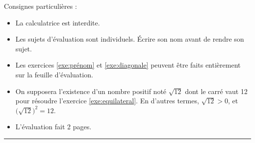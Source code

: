 
\usepackage{needspace}

\SetDate[15/10/2025]
\reversemarginpar
\setlength{\marginparsep}{.5cm}

\newcommand{\exeI}{1}
\newcommand{\exeII}{2}
\newcommand{\exeIII}{3}
\newcommand{\exeIV}{4}
\newcommand{\exeV}{5}
\newcommand{\exeVI}{6}
\newcommand{\exeVII}{7}
\newcommand{\exeVIII}{8}
\newcommand{\exeIX}{9}
\newcommand{\exeX}{10}
\newcommand{\exeXI}{11}


\pagestyle{fancy}
\fancyhead[R]{\today}

\null\vspace{-30pt}
Consignes particulières : 
\begin{itemize}[label=$\bullet$]
	\item 
	La calculatrice est {interdite}.
	\item
	Les sujets d'évaluation sont individuels. Écrire son nom avant de rendre son sujet.
	\item
	Les exercices \ref{exe:prénom} et \ref{exe:diagonale} peuvent être faits entièrement sur la feuille d'évaluation. 
	\item 
	On supposera l'existence d'un nombre positif noté $\sqrt{12}$ dont le carré vaut 12 pour résoudre l'exercice \ref{exe:equilateral}.
	En d'autres termes, $\sqrt{12} > 0$, et $\bigl(\sqrt{12}\bigr)^2 = 12$.
	\item
	L'évaluation fait 2 pages.
\end{itemize}

\marginpar{[pts]}
\hrule







%













%


\newpage
{}
\shipoutAnswer


